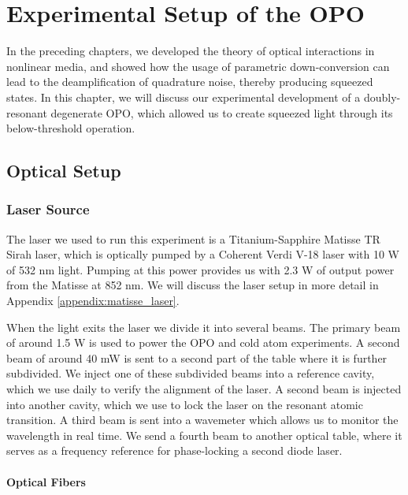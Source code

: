 \chapter{Experimental Setup of the OPO} 
\label{ch:4}
\minitoc

In the preceding chapters, we developed the theory of optical interactions in nonlinear media, and showed how the usage of parametric down-conversion can lead to the deamplification of quadrature noise, thereby producing squeezed states.  In this chapter, we will discuss our experimental development of a doubly-resonant degenerate OPO, which allowed us to create squeezed light through its below-threshold operation.  
 

\section{Optical Setup}
\label{optical_setup}

\subsection{Laser Source} 
\label{laser_source}

The laser we used to run this experiment is a Titanium-Sapphire Matisse TR Sirah laser, which is optically pumped by a Coherent Verdi V-18 laser with 10 W of 532 nm light.  Pumping at this power provides us with 2.3 W of output power from the Matisse at 852 nm.  We will discuss the laser setup in more detail in Appendix \ref{appendix:matisse_laser}. 

When the light exits the laser we divide it into several beams.  The primary beam of around 1.5 W is used to power the OPO and cold atom experiments.  A second beam of around 40 mW  is sent to a second part of the table where it is further subdivided.  We inject one of these subdivided beams into a reference cavity, which we use daily to verify the alignment of the laser.  A second beam is injected into another cavity, which we use to lock the laser on the resonant atomic transition. A third beam is sent into a wavemeter which allows us to monitor the wavelength in real time.  We send a fourth beam to another optical table, where it serves as a frequency reference for phase-locking a second diode laser.


 
\subsubsection{Optical Fibers} 
\label{optical_fibers}
  
